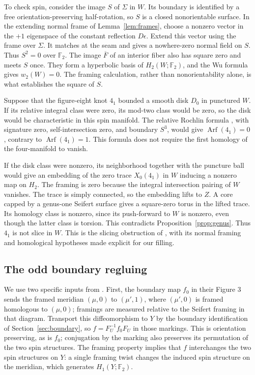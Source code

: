 \documentclass[11pt]{amsart}
\theoremstyle{definition}
\theoremstyle{remark}
\newcommand{\Ftwo}{\mathbb F_2}
\begin{document}
To check spin, consider the image $S$ of $\Sigma$ in $W$.
Its boundary is identified by a free orientation-preserving half-rotation,
so $S$ is a closed nonorientable surface. In the extending normal
frame of Lemma~\ref{lem:frames}, choose a nonzero vector in the
$+1$ eigenspace of the constant reflection $D\epsilon$. Extend
this vector using the frame over $\Sigma$. It matches at the seam
and gives a nowhere-zero normal field on $S$. Thus $S^2=0$ over
$\Ftwo$. The image $\overline F$ of an interior fiber also has
square zero and meets $S$ once. They form a hyperbolic basis of
$H_2(W;\Ftwo)$, and the Wu formula gives $w_2(W)=0$.
The framing calculation, rather than nonorientability alone, is what
establishes the square of $S$.

Suppose that the figure-eight knot $4_1$ bounded a smooth disk
$D_0$ in punctured $W$. If its relative integral class were zero,
its mod-two class would be zero, so the disk would be characteristic
in this spin manifold. The relative Rochlin formula
\cite[Theorem 2]{Klu21}, with signature zero, self-intersection
zero, and boundary $S^3$, would give $\operatorname{Arf}(4_1)=0$,
contrary to $\operatorname{Arf}(4_1)=1$. This formula does not
require the first homology of the four-manifold to vanish.

If the disk class were nonzero, its neighborhood together with the
puncture ball would give an embedding of the zero trace $X_0(4_1)$
in $W$ inducing a nonzero map on $H_2$. The framing is zero because
the integral intersection pairing of $W$ vanishes. The trace is
simply connected, so the embedding lifts to $Z$. A core capped by
a genus-one Seifert surface gives a square-zero torus in the lifted
trace. Its homology class is nonzero, since its push-forward to $W$
is nonzero, even though the latter class is torsion. This contradicts
Proposition~\ref{prop:genus}. Thus $4_1$ is not slice in $W$.
This is the slicing obstruction of \cite{LP25}, with its normal
framing and homological hypotheses made explicit for our filling.

\subsection{The odd boundary regluing}\label{subsec:odd}
We use two specific inputs from \cite[Section 3]{LP25}.
First, the boundary map $f_0$ in their Figure 3 sends the framed
meridian $(\mu,0)$ to $(\mu',1)$, where $(\mu',0)$ is framed
homologous to $(\mu,0)$; framings are measured relative to the
Seifert framing in that diagram. Transport this diffeomorphism to
$Y$ by the boundary identification of Section~\ref{sec:boundary},
so $f=F_U^{-1}f_0F_U$ in those markings. This is orientation
preserving, as is $f_0$; conjugation by the marking also preserves
its permutation of the two spin structures. The framing property
implies that $f$ interchanges the two spin structures on $Y$:
a single framing twist changes the induced spin structure on the
meridian, which generates $H_1(Y;\Ftwo)$.
\end{document}

